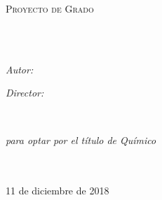 \documentclass[
12pt, %
spanish, %
onehalfspacing,
headsepline, %
]{theme} %
\author{Juan \textsc{Barbosa Coy}} %
\begin{document}
\frontmatter %

\pagestyle{plain} %


\begin{titlepage}
\begin{center}

\vspace*{.06\textheight}
{\scshape\LARGE \univname\par}\vspace{1.5cm} %
\textsc{\Large Proyecto de Grado}\\[0.5cm] %

\HRule \\[0.4cm] %
{\LARGE \bfseries \ttitle\par}\vspace{0.4cm} %
\HRule \\[1.5cm] %
 
\begin{minipage}[t]{0.4\textwidth}
\begin{flushleft} \large
\emph{Autor:}\\
\href{https://www.github.com/jsbarbosa}{\authorname} %
\end{flushleft}
\end{minipage}
\begin{minipage}[t]{0.4\textwidth}
\begin{flushright} \large
\emph{Director:} \\
\href{http://quimica.uniandes.edu.co/es/el-departamento/profesores/planta-3#}{\supname} %
\end{flushright}
\end{minipage}\\[2cm]
 
\vfill

\large \textit{\degreename para optar por el título de Químico}\\[0.3cm] %
\groupname\\\deptname\\[2cm] %
 
\vfill

{\large 11 de diciembre de 2018}\\[4cm] %
 
\vfill
\end{center}
\end{titlepage}
\end{document}
